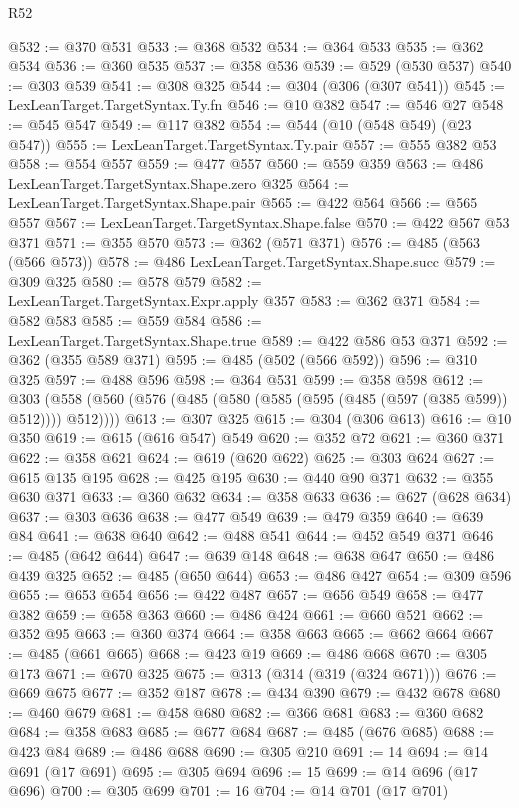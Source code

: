 \begin{lexlean}{R52}
\begin{coremodule}
@532 := @370 @531
@533 := @368 @532
@534 := @364 @533
@535 := @362 @534
@536 := @360 @535
@537 := @358 @536
@539 := @529 (@530 @537)
@540 := @303 @539
@541 := @308 @325
@544 := @304 (@306 (@307 @541))
@545 := LexLeanTarget.TargetSyntax.Ty.fn
@546 := @10 @382
@547 := @546 @27
@548 := @545 @547
@549 := @117 @382
@554 := @544 (@10 (@548 @549) (@23 @547))
@555 := LexLeanTarget.TargetSyntax.Ty.pair
@557 := @555 @382 @53
@558 := @554 @557
@559 := @477 @557
@560 := @559 @359
@563 := @486 LexLeanTarget.TargetSyntax.Shape.zero @325
@564 := LexLeanTarget.TargetSyntax.Shape.pair
@565 := @422 @564
@566 := @565 @557
@567 := LexLeanTarget.TargetSyntax.Shape.false
@570 := @422 @567 @53 @371
@571 := @355 @570
@573 := @362 (@571 @371)
@576 := @485 (@563 (@566 @573))
@578 := @486 LexLeanTarget.TargetSyntax.Shape.succ
@579 := @309 @325
@580 := @578 @579
@582 := LexLeanTarget.TargetSyntax.Expr.apply @357
@583 := @362 @371
@584 := @582 @583
@585 := @559 @584
@586 := LexLeanTarget.TargetSyntax.Shape.true
@589 := @422 @586 @53 @371
@592 := @362 (@355 @589 @371)
@595 := @485 (@502 (@566 @592))
@596 := @310 @325
@597 := @488 @596
@598 := @364 @531
@599 := @358 @598
@612 := @303 (@558 (@560 (@576 (@485 (@580 (@585 (@595 (@485 (@597 (@385 @599)) @512)))) @512))))
@613 := @307 @325
@615 := @304 (@306 @613)
@616 := @10 @350
@619 := @615 (@616 @547) @549
@620 := @352 @72
@621 := @360 @371
@622 := @358 @621
@624 := @619 (@620 @622)
@625 := @303 @624
@627 := @615 @135 @195
@628 := @425 @195
@630 := @440 @90 @371
@632 := @355 @630 @371
@633 := @360 @632
@634 := @358 @633
@636 := @627 (@628 @634)
@637 := @303 @636
@638 := @477 @549
@639 := @479 @359
@640 := @639 @84
@641 := @638 @640
@642 := @488 @541
@644 := @452 @549 @371
@646 := @485 (@642 @644)
@647 := @639 @148
@648 := @638 @647
@650 := @486 @439 @325
@652 := @485 (@650 @644)
@653 := @486 @427
@654 := @309 @596
@655 := @653 @654
@656 := @422 @487
@657 := @656 @549
@658 := @477 @382
@659 := @658 @363
@660 := @486 @424
@661 := @660 @521
@662 := @352 @95
@663 := @360 @374
@664 := @358 @663
@665 := @662 @664
@667 := @485 (@661 @665)
@668 := @423 @19
@669 := @486 @668
@670 := @305 @173
@671 := @670 @325
@675 := @313 (@314 (@319 (@324 @671)))
@676 := @669 @675
@677 := @352 @187
@678 := @434 @390
@679 := @432 @678
@680 := @460 @679
@681 := @458 @680
@682 := @366 @681
@683 := @360 @682
@684 := @358 @683
@685 := @677 @684
@687 := @485 (@676 @685)
@688 := @423 @84
@689 := @486 @688
@690 := @305 @210
@691 := 14
@694 := @14 @691 (@17 @691)
@695 := @305 @694
@696 := 15
@699 := @14 @696 (@17 @696)
@700 := @305 @699
@701 := 16
@704 := @14 @701 (@17 @701)

\end{coremodule}
\end{lexlean}
